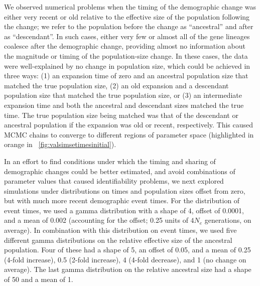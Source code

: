 We observed numerical problems when the timing of the demographic change was
either very recent or old relative to the effective size of the population
following the change;
we refer to the population before the change as ``ancestral'' and after as
``descendant''.
In such cases, either very few or almost all of the gene lineages coalesce
after the demographic change,
providing almost no information about the magnitude or
timing of the population-size change.
In these cases, the data were well-explained by no change in population size,
which could be achieved in three ways:
(1) an expansion time of zero and an ancestral population
size that matched the true population size,
(2) an old expansion and a descendant population size that matched the true
population size,
or (3) an intermediate expansion time and both the ancestral and descendant
sizes matched the true time.
The true population size being matched was that of the descendant or ancestral
population if the expansion was old or recent, respectively.
This caused MCMC chains to converge to different regions of parameter
space
(highlighted in orange in \fig{}~\ref{fig:valsimsetimesinitial}).

In an effort to find conditions under which the timing and sharing of
demographic changes could be better estimated, and avoid combinations
of parameter values that caused identifiability problems,
we next explored simulations under distributions on times and population sizes
offset from zero, but with much more recent demographic event times.
For the distribution of event times, we used a gamma distribution
with a shape of 4, offset of 0.0001, and a mean of 0.002 (accounting
for the offset; 0.25 units of $4N_e$ generations, on average).
In combination with this distribution on event times,
we used five different gamma distributions on the relative
effective size of the ancestral population.
Four of these had a shape of 5, an offset of 0.05, and a mean
of
0.25 (4-fold increase),
0.5 (2-fold increase),
4 (4-fold decrease),
and
1 (no change on average).
The last gamma distribution on the relative ancestral size had a shape of 50
and a mean of 1.

